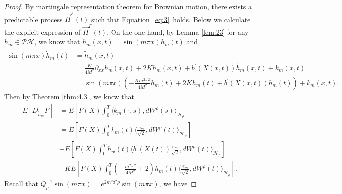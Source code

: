 \documentclass[11pt]{article}
\numberwithin{equation}{section}%
\numberwithin{figure}{section}%
\theoremstyle{remark}
\begin{document}
	\begin{proof}
		By martingale representation theorem for Brownian motion, there exists a predictable process $\vec{H}^{F}(t)$ such that Equation~\eqref{eq:3}~holds. Below we calculate the explicit expression of $\vec{H}^{F}(t)$. On the one hand, by Lemma \ref{lem:23} for any $\tilde{h}_{m}\in \mathcal{PH}$, we know that $\tilde{h}_{m}(x,t)=\sin(m\pi x)h_{m}(t)$ and 
		\begin{align*}
			\sin(m\pi x)\dot{h}_{m}(t)&=\dot{\tilde{h}}_m\left(x, t\right)\\
			&=\frac{K}{4 M^2} \partial_{xx} \tilde{h}_m\left(x, t\right)+2 K \tilde{h}_m\left(x, t\right)+ b^{\prime}\left(X\left(x, t\right)\right) \tilde{h}_m\left(x, t\right)+ k_{m}\left(x, t\right)\\
			&=\sin(m\pi x)\left(-\frac{Km^{2}\pi^{2}}{4M^2}h_{m}(t)+2Kh_{m}\left( t\right)+ b^{\prime}\left(X\left(x, t\right)\right) h_{m}\left( t\right)\right)+ k_{m}\left(x, t\right).
		\end{align*}
		Then by Theorem \ref{thm:4.3}, we know that
		\begin{equation}\label{eq:martin}
			\begin{split}
			E\left[D_{\tilde{h}_{m}} F\right]&=E[F(X)\int_{0}^{T}\langle k_{m}(\cdot,s),dW^{\rho}(s)\rangle_{\mathcal{H}_{\rho}}]\\
			&=E\left[F(X) \int_0^T\dot{h}_{m}(t)\langle\frac{e_{m}}{\sqrt{2}},dW^{\rho}(t)\rangle_{\mathcal{H}_{\rho}}\right]\\
			&-E\left[F(X) \int_0^Th_{m}(t)\langle  b^{\prime}\left(X\left(t\right)\right)\frac{e_{m}}{\sqrt{2}},dW^{\rho}(t)\rangle_{\mathcal{H}_{\rho}}\right]\\
			& -K  E\left[F(X)\int_0^T \left(-\frac{m^{2}\pi^{2}}{4 M^2}+2\right)h_{m}(t)\langle\frac{e_{m}}{\sqrt{2}} ,dW^{\rho}(t)\rangle_{\mathcal{H}_{\rho}}\right].
			\end{split}
		\end{equation}
	Recall that $Q_{\rho}^{-1}\sin(m\pi x)=e^{2m^{2}\pi^{2}\rho}\sin(m\pi x)$, we have

\end{proof}
\end{document}
